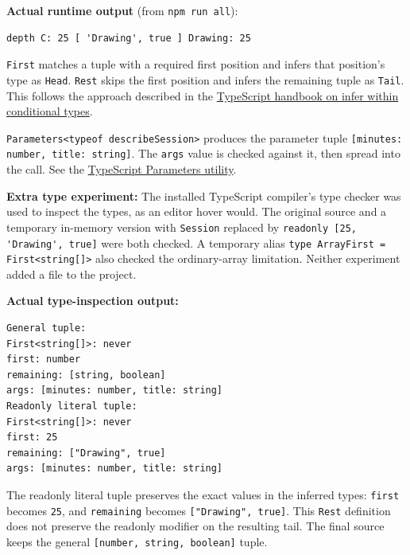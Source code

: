 \documentclass[
  11pt,
]{article}
\newcommand{\passthrough}[1]{#1}
\begin{document}
\textbf{Actual runtime output} (from
\passthrough{\lstinline!npm run all!}):

\begin{lstlisting}
depth C: 25 [ 'Drawing', true ] Drawing: 25
\end{lstlisting}

\passthrough{\lstinline!First!} matches a tuple with a required first
position and infers that position's type as
\passthrough{\lstinline!Head!}. \passthrough{\lstinline!Rest!} skips the
first position and infers the remaining tuple as
\passthrough{\lstinline!Tail!}. This follows the approach described in
the
\href{https://www.typescriptlang.org/docs/handbook/2/conditional-types.html\#inferring-within-conditional-types}{TypeScript
handbook on infer within conditional types}.

\passthrough{\lstinline!Parameters<typeof describeSession>!} produces
the parameter tuple
\passthrough{\lstinline![minutes: number, title: string]!}. The
\passthrough{\lstinline!args!} value is checked against it, then spread
into the call. See the
\href{https://www.typescriptlang.org/docs/handbook/utility-types.html\#parameterstype}{TypeScript
Parameters utility}.

\textbf{Extra type experiment:} The installed TypeScript compiler's type
checker was used to inspect the types, as an editor hover would. The
original source and a temporary in-memory version with
\passthrough{\lstinline!Session!} replaced by
\passthrough{\lstinline!readonly [25, 'Drawing', true]!} were both
checked. A temporary alias
\passthrough{\lstinline!type ArrayFirst = First<string[]>!} also checked
the ordinary-array limitation. Neither experiment added a file to the
project.

\textbf{Actual type-inspection output:}

\begin{lstlisting}
General tuple:
First<string[]>: never
first: number
remaining: [string, boolean]
args: [minutes: number, title: string]
Readonly literal tuple:
First<string[]>: never
first: 25
remaining: ["Drawing", true]
args: [minutes: number, title: string]
\end{lstlisting}

The readonly literal tuple preserves the exact values in the inferred
types: \passthrough{\lstinline!first!} becomes
\passthrough{\lstinline!25!}, and \passthrough{\lstinline!remaining!}
becomes \passthrough{\lstinline!["Drawing", true]!}. This
\passthrough{\lstinline!Rest!} definition does not preserve the readonly
modifier on the resulting tail. The final source keeps the general
\passthrough{\lstinline![number, string, boolean]!} tuple.
\end{document}
